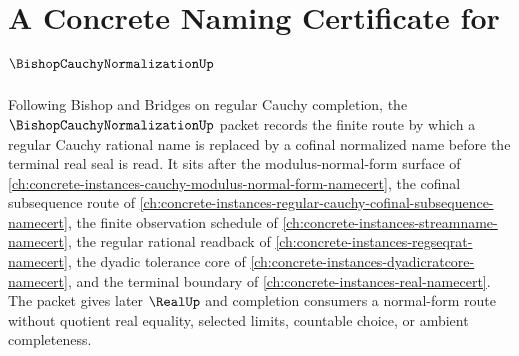 \chapter{A Concrete Naming Certificate for $\BishopCauchyNormalizationUp$}
\label{ch:concrete-instances-bishop-cauchy-normalization-namecert}

Following Bishop and Bridges on regular Cauchy completion, the $\BishopCauchyNormalizationUp$ packet records the finite route by which a regular Cauchy rational name is replaced by a cofinal normalized name before the terminal real seal is read. It sits after the modulus-normal-form surface of \autoref{ch:concrete-instances-cauchy-modulus-normal-form-namecert}, the cofinal subsequence route of \autoref{ch:concrete-instances-regular-cauchy-cofinal-subsequence-namecert}, the finite observation schedule of \autoref{ch:concrete-instances-streamname-namecert}, the regular rational readback of \autoref{ch:concrete-instances-regseqrat-namecert}, the dyadic tolerance core of \autoref{ch:concrete-instances-dyadicratcore-namecert}, and the terminal boundary of \autoref{ch:concrete-instances-real-namecert}. The packet gives later $\RealUp$ and completion consumers a normal-form route without quotient real equality, selected limits, countable choice, or ambient completeness.

